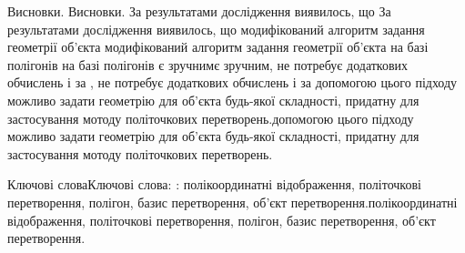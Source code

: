 \documentclass[12pt,a4paper]{article}
\begin{document}
\par
Висновки. Висновки. За результатами дослідження виявилось, що За результатами дослідження виявилось, що модифікований алгоритм задання геометрії об’єкта модифікований алгоритм задання геометрії об’єкта на базі полігонів на базі полігонів є зручнимє зручним, не потребує додаткових обчислень і за , не потребує додаткових обчислень і за допомогою цього підходу можливо задати геометрію для об’єкта будь-якої складності, придатну для застосування мотоду політочкових перетворень.допомогою цього підходу можливо задати геометрію для об’єкта будь-якої складності, придатну для застосування мотоду політочкових перетворень.
\par
Ключові словаКлючові слова: : полікоординатні відображення, політочкові перетворення, полігон, базис перетворення, об’єкт перетворення.полікоординатні відображення, політочкові перетворення, полігон, базис перетворення, об’єкт перетворення.
\par
\end{document}
